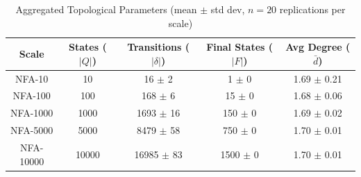 \begin{table}[htbp]
\caption{Aggregated Topological Parameters (mean $\pm$ std dev, $n = 20$ replications per scale)}
\label{tab:storage_footprint}
\centering
\small
\begin{tabular}{ccccc}
\toprule
\textbf{Scale} & \textbf{States ($|Q|$)} & \textbf{Transitions ($|\delta|$)} & \textbf{Final States ($|F|$)} & \textbf{Avg Degree ($\bar{d}$)} \\
\midrule
NFA-10 &    10 &      16 $\pm$ 2 &        1 $\pm$ 0 &         1.69 $\pm$ 0.21 \\
NFA-100 &   100 &     168 $\pm$ 6 &       15 $\pm$ 0 &        1.68 $\pm$ 0.06 \\
NFA-1000 &  1000 &    1693 $\pm$ 16 &     150 $\pm$ 0 &       1.69 $\pm$ 0.02 \\
NFA-5000 &  5000 &    8479 $\pm$ 58 &     750 $\pm$ 0 &       1.70 $\pm$ 0.01 \\
NFA-10000 & 10000 &   16985 $\pm$ 83 &    1500 $\pm$ 0 &      1.70 $\pm$ 0.01 \\
\bottomrule
\end{tabular}
\end{table}
